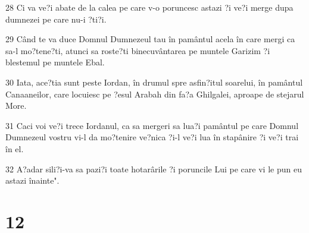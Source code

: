 \par 28 Ci va ve?i abate de la calea pe care v-o poruncesc astazi ?i ve?i merge dupa dumnezei pe care nu-i ?ti?i.
\par 29 Când te va duce Domnul Dumnezeul tau în pamântul acela în care mergi ca sa-l mo?tene?ti, atunci sa roste?ti binecuvântarea pe muntele Garizim ?i blestemul pe muntele Ebal.
\par 30 Iata, ace?tia sunt peste Iordan, în drumul spre asfin?itul soarelui, în pamântul Canaaneilor, care locuiesc pe ?esul Arabah din fa?a Ghilgalei, aproape de stejarul More.
\par 31 Caci voi ve?i trece Iordanul, ca sa mergeri sa lua?i pamântul pe care Domnul Dumnezeul vostru vi-l da mo?tenire ve?nica ?i-l ve?i lua în stapânire ?i ve?i trai în el.
\par 32 A?adar sili?i-va sa pazi?i toate hotarârile ?i poruncile Lui pe care vi le pun eu astazi înainte".

\chapter{12}


